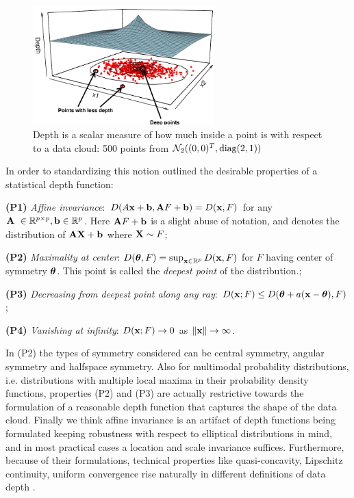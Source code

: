 \begin{figure}
	\centering
		\includegraphics[width=7cm]{Chapter-regression/depthplot_cropped}
	\caption{Depth is a scalar measure of how much inside a point is with respect to a data cloud: 500 points from ${\cal{N}}_2 ((0,0)^T, \operatorname*{diag} (2,1))$}
	\label{fig:depthplot}
\end{figure}

In order to standardizing this notion \cite{liu90} outlined the desirable properties of a statistical depth function:

\vspace{1em}
\noindent\textbf{(P1)} \textit{Affine invariance}: $D(A{\bf{x}} + {\bf{b}}, {\mathbf{A}} F + {\bf{b}}) = D({\bf{x}}, F)$ for any ${\mathbf{A}}\ \in {\mathbb{R}}^{p \times p}, {\bf{b}} \in {\mathbb{R}}^p$. Here ${\mathbf{A}} F + {\bf{b}}$ is a slight abuse of notation, and denotes the distribution of ${\mathbf{A}} {\mathbf{X}} + {\bf{b}}$ where ${\mathbf{X}} \sim F$;

\noindent\textbf{(P2)} \textit{Maximality at center}: $D({\boldsymbol{\theta}}, F) = \sup_{{\bf{x}}\in \mathbb{R}^p} D({\bf{x}}, F)$ for $F$ having center of symmetry ${\boldsymbol{\theta}}$. This point is called the \textit{deepest point} of the distribution.;

\noindent\textbf{(P3)} \textit{Decreasing from deepest point along any ray}: $D({\bf{x}}; F) \leq D({\boldsymbol{\theta}} + a({\bf{x}} - {\boldsymbol{\theta}}), F)$;

\noindent\textbf{(P4)} \textit{Vanishing at infinity}: $D({\bf{x}}; F) \rightarrow 0$ as $\|{\bf{x}}\| \rightarrow \infty $.

\vspace{1em}
In (P2) the types of symmetry considered can be central symmetry, angular symmetry and halfspace symmetry. Also for multimodal probability distributions, i.e. distributions with multiple local maxima in their probability density functions, properties (P2) and (P3) are actually restrictive towards the formulation of a reasonable depth function that captures the shape of the data cloud. Finally we think affine invariance is an artifact of depth functions being formulated keeping robustness with respect to elliptical distributions in mind, and in most practical cases a location and scale invariance suffices. Furthermore, because of their formulations, technical properties like quasi-concavity, Lipschitz continuity, uniform convergence rise naturally in different definitions of data depth \citep{liu90, zuo00, MoslerChapter13}.

